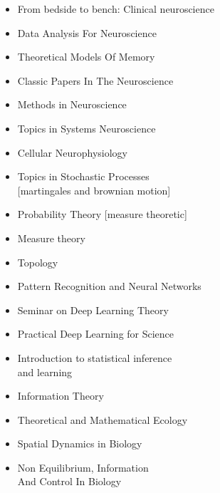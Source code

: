
\begin{itemize}
\item From bedside to bench: Clinical neuroscience 
\item Data Analysis For Neuroscience
\item Theoretical Models Of Memory
\item Classic Papers In The Neuroscience
\item Methods in Neuroscience	
\item Topics in Systems Neuroscience
\item Cellular Neurophysiology
\end{itemize}

\begin{itemize}
\item Topics in Stochastic Processes\\ {\small[martingales and brownian motion]}
\item Probability Theory {\small[measure theoretic]}
\item Measure theory
\item Topology
\end{itemize}

\begin{itemize}
\item Pattern Recognition and Neural Networks
\item Seminar on Deep Learning Theory
\item Practical Deep Learning for Science
\item Introduction to statistical inference \\ and learning
\item Information Theory
\end{itemize}


\begin{itemize}
\item Theoretical and Mathematical Ecology
\item Spatial Dynamics in Biology
\item Non Equilibrium, Information \\And Control In Biology
\end{itemize}



